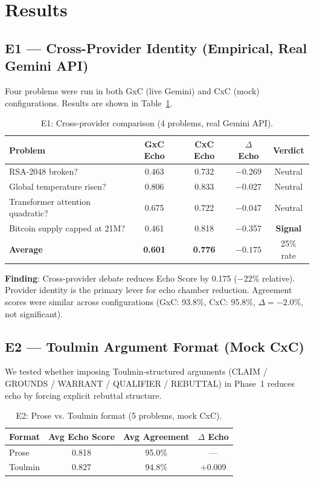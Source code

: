\documentclass[11pt]{article}
\begin{document}
\section{Results}
\label{sec:results}

\subsection{E1 — Cross-Provider Identity (Empirical, Real Gemini API)}
\label{sec:e1}

Four problems were run in both GxC (live Gemini) and CxC (mock) configurations. Results are shown in Table~\ref{tab:e1}.

\begin{table}[h]
\centering
\caption{E1: Cross-provider comparison (4 problems, real Gemini API).}
\label{tab:e1}
\begin{tabular}{lcccc}
\toprule
Problem & GxC Echo & CxC Echo & $\Delta$ Echo & Verdict \\
\midrule
RSA-2048 broken? & 0.463 & 0.732 & $-$0.269 & Neutral \\
Global temperature risen? & 0.806 & 0.833 & $-$0.027 & Neutral \\
Transformer attention quadratic? & 0.675 & 0.722 & $-$0.047 & Neutral \\
Bitcoin supply capped at 21M? & 0.461 & 0.818 & $-$0.357 & \textbf{Signal} \\
\midrule
\textbf{Average} & \textbf{0.601} & \textbf{0.776} & $\mathbf{-0.175}$ & 25\% rate \\
\bottomrule
\end{tabular}
\end{table}

\noindent\textbf{Finding}: Cross-provider debate reduces Echo Score by 0.175 ($-$22\% relative). Provider identity is the primary lever for echo chamber reduction. Agreement scores were similar across configurations (GxC: 93.8\%, CxC: 95.8\%, $\Delta = -2.0\%$, not significant).

\subsection{E2 — Toulmin Argument Format (Mock CxC)}
\label{sec:e2}

We tested whether imposing Toulmin-structured arguments (CLAIM / GROUNDS / WARRANT / QUALIFIER / REBUTTAL) in Phase~1 reduces echo by forcing explicit rebuttal structure.

\begin{table}[h]
\centering
\caption{E2: Prose vs. Toulmin format (5 problems, mock CxC).}
\label{tab:e2}
\begin{tabular}{lccc}
\toprule
Format & Avg Echo Score & Avg Agreement & $\Delta$ Echo \\
\midrule
Prose & 0.818 & 95.0\% & --- \\
Toulmin & 0.827 & 94.8\% & $+$0.009 \\
\bottomrule
\end{tabular}
\end{table}
\end{document}

